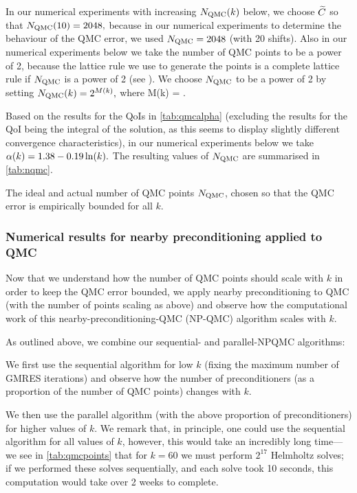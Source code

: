 In our numerical experiments with increasing $N_{\mathrm{QMC}}(k)$ below, we choose $\widetilde{C}$ so that $N_{\mathrm{QMC}}(10) = 2048,$ because in our numerical experiments to determine the behaviour of the QMC error, we used $N_{\mathrm{QMC}} = 2048$ (with 20 shifts). Also in our numerical experiments below we take the number of QMC points to be a power of 2, because the lattice rule we use to generate the points is a complete lattice rule if $N_{\mathrm{QMC}}$ is a power of 2 (see \cite{NuREADME}). We choose $N_{\mathrm{QMC}}$ to be a power of 2 by setting $N_{\mathrm{QMC}}(k) = 2^{M(k)},$ where
\beqs
M(k) = .
\eeqs

Based on the results for the QoIs in \cref{tab:qmcalpha} (excluding the results for the QoI being the integral of the solution, as this seems to display slightly different convergence characteristics), in our numerical experiments below we take $\alpha(k) = 1.38 - 0.19  \operatorname{ln}(k).$ The resulting values of $N_{\mathrm{QMC}}$ are summarised in \cref{tab:nqmc}.

\begin{table}[h]
  \centering
  
  \caption{The ideal and actual number of QMC points $N_{\mathrm{QMC}}$, chosen so that the QMC error is empirically bounded for all $k$.}\label{tab:qmcpoints}
  \end{table}

\subsubsection{Numerical results for nearby preconditioning applied to QMC}

Now that we understand how the number of QMC points should scale with $k$ in order to keep the QMC error bounded, we apply nearby preconditioning to QMC (with the number of points scaling as above) and observe how the computational work of this nearby-preconditioning-QMC (NP-QMC) algorithm scales with $k.$

As outlined above, we combine our sequential- and parallel-NPQMC algorithms:
\bit
\item We first use the sequential algorithm for low $k$ (fixing the maximum number of GMRES iterations) and observe how the number of preconditioners (as a proportion of the number of QMC points) changes with $k$.
  \item We then use the parallel algorithm (with the above proportion of preconditioners) for higher values of $k.$
    \eit
    We remark that, in principle, one could use the sequential algorithm for all values of $k$, however, this would take an incredibly long time--- we see in \cref{tab:qmcpoints} that for $k=60$ we must perform $2^{17}$ Helmholtz solves; if we performed these solves sequentially, and each solve took 10 seconds, this computation would take over 2 weeks to complete.

